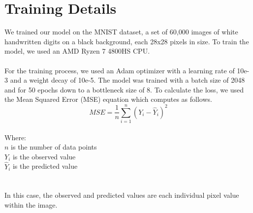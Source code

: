\documentclass[letterpaper,11pt,twoside]{article}
\begin{document}
\section{Training Details}
We trained our model on the MNIST dataset, a set of 60,000 images of white handwritten digits on a black background, each 28x28 pixels in size. To train the model, we used an AMD Ryzen 7 4800HS CPU.
\\
\\
For the training process, we used an Adam optimizer with a learning rate of 10e-3 and a weight decay of 10e-5. The model was trained with a batch size of 2048 and for 50 epochs down to a bottleneck size of 8. To calculate the loss, we used the Mean Squared Error (MSE) equation which computes as follows.
\begin{equation}
  MSE = \frac{1}{n} \sum_{i=1}^{n}(Y_i - \hat{Y}_i)^2
\end{equation}
\\
Where: \\
$n$ \>\> is the number of data points \\
$Y_i$ \> is the observed value\\
$\hat{Y}_i$ \> is the predicted value \\
\\
\\
In this case, the observed and predicted values are each individual pixel value within the image.
\end{document}

